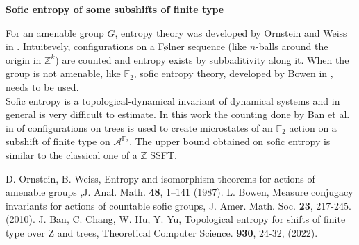\documentclass[12pt,a4paper]{article}
\begin{document}
\begin{center}
{\large{\bf Sofic entropy of some subshifts of finite type } }
\\

\end{center}

\noindent

For an amenable group $G$, entropy theory was developed by Ornstein and 
Weiss in 
\cite{weiss}. Intuitevely, configurations on a Følner sequence (like $n$-balls around
the origin in $\mathbb{Z}^k$)
are counted and entropy exists by subbaditivity along it. When the group
is not amenable, like $\mathbb{F}_2$, sofic entropy theory, developed
by Bowen in \cite{bowen_1}, needs to be used. 
\\
Sofic entropy is a topological-dynamical
invariant of dynamical systems and in general is very difficult to
estimate. In this work the counting done by Ban et al. in \cite{ban}  of configurations
on trees is used to 
create microstates of an $\mathbb{F}_2$ action on a subshift of finite type on
$\mathcal{A}^{\mathbb{F}_2}$. The upper bound obtained on sofic entropy
is similar to the classical one of a $\mathbb{Z}$ SSFT.



\begingroup
\renewcommand{\section}[2]{}
\begin{thebibliography}{0}
\setlength{\parskip}{0mm}
\setlength{\itemsep}{-0.3mm}
\small
{} D. Ornstein, B. Weiss,  Entropy and isomorphism theorems for actions
of amenable groups  ,J. Anal. Math. \textbf{48}, 1–141 (1987).
 L. Bowen, Measure conjugacy invariants for actions of countable sofic groups,
J. Amer. Math. Soc. \textbf{23}, 217-245. (2010).
 J. Ban, C. Chang, W. Hu, Y. Yu, Topological entropy for shifts of finite type over Z and trees,
Theoretical Computer Science. \textbf{930}, 24-32, (2022). 
\end{thebibliography}
\endgroup
\end{document}
